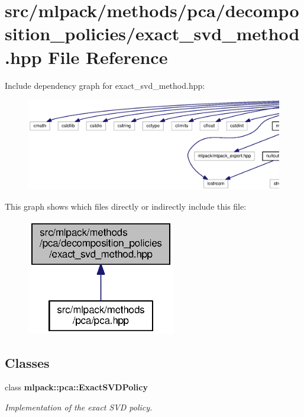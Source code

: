 \section{src/mlpack/methods/pca/decomposition\+\_\+policies/exact\+\_\+svd\+\_\+method.hpp File Reference}
\label{exact__svd__method_8hpp}
Include dependency graph for exact\+\_\+svd\+\_\+method.\+hpp\+:
\nopagebreak
\begin{figure}[H]
\begin{center}
\leavevmode
\includegraphics[width=350pt]{exact__svd__method_8hpp__incl}
\end{center}
\end{figure}
This graph shows which files directly or indirectly include this file\+:
\nopagebreak
\begin{figure}[H]
\begin{center}
\leavevmode
\includegraphics[width=184pt]{exact__svd__method_8hpp__dep__incl}
\end{center}
\end{figure}
\subsection*{Classes}
\begin{DoxyCompactItemize}
\item 
class {\bf mlpack\+::pca\+::\+Exact\+S\+V\+D\+Policy}
\begin{DoxyCompactList}\small\item\em Implementation of the exact S\+VD policy. \end{DoxyCompactList}\end{DoxyCompactItemize}
